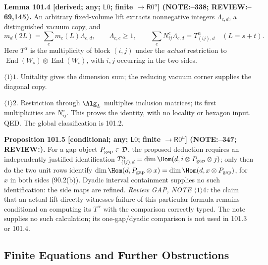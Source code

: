 \textbf{Lemma 101.4 [derived; any; \(\mathsf L0\); finite \(\to\mathsf R0^u\)] (NOTE:--338; REVIEW:--69,145).}
An arbitrary fixed-volume lift extracts nonnegative integers \(\Lambda_{c,d}\), a distinguished vacuum copy, and
\[
 m_d(2L)=\sum_c m_c(L)\Lambda_{c,d},\qquad \Lambda_{c,c}\ge1,\qquad
 \sum_cN_{ij}^c\Lambda_{c,d}=T^\alpha_{(ij),d}\quad(L=s+t).
\]
Here \(T^\alpha\) is the multiplicity of block \((i,j)\) under the \emph{actual} restriction to
\(\operatorname{End}(W_s)\otimes\operatorname{End}(W_t)\), with \(i,j\) occurring in the two sides.
\par\(\langle1\rangle1\). Unitality gives the dimension sum; the reducing vacuum corner supplies the diagonal copy.
\par\(\langle1\rangle2\). Restriction through \(\Alg_L\) multiplies inclusion matrices; its first multiplicities are
\(N_{ij}^c\). This proves the identity, with no locality or hexagon input. QED. The global classification is 101.2.

\textbf{Proposition 101.5 [conditional; any; \(\mathsf L0\); finite \(\to\mathsf R0^u\)] (NOTE:--347; REVIEW:).}
For a gap object \(P_{\rm gap}\in\mathcal D\), the proposed deduction requires an independently justified identification
\(T^\alpha_{(ij),d}=\dim\Hom(d,i\otimes P_{\rm gap}\otimes j)\); only then do the two unit rows identify
\(\dim\Hom(d,P_{\rm gap}\otimes x)=\dim\Hom(d,x\otimes P_{\rm gap})\), for \(x\) in both sides (90.2(b)).
Dyadic interval containment supplies no such identification: the side maps are refined.
\emph{Review GAP, NOTE \(\langle1\rangle4\):} the claim that an actual lift directly witnesses failure of this
particular formula remains conditional on computing its \(T^\alpha\) with the comparison correctly typed.
The note supplies no such calculation; its one-gap/dyadic comparison is not used in 101.3 or 101.4.

\subsection{Finite Equations and Further Obstructions}

